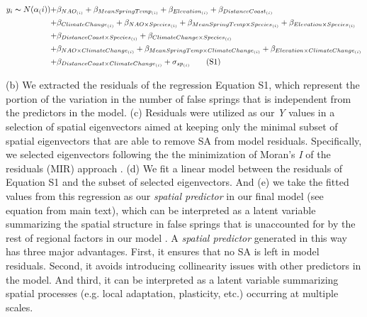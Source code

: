 \documentclass{article}\usepackage[]{graphicx}\usepackage[]{color}
\begin{document}
\begin{align*}
y_i \thicksim N(\alpha_(i)) +&  \beta_{NAO_{(i)}} + \beta_{MeanSpringTemp_{(i)}} + \beta_{Elevation_{(i)}} + \beta_{DistanceCoast_{(i)}} \\ +& \beta_{ClimateChange_{(i)}}
+ \beta_{NAO \times Species_{(i)}} + \beta_{MeanSpringTemp \times Species_{(i)}} + \beta_{Elevation \times Species_{(i)}} \\ +& \beta_{DistanceCoast \times Species_{(i)}} + \beta_{ClimateChange \times Species_{(i)}} \\
+& \beta_{NAO \times ClimateChange_{(i)}} + \beta_{MeanSpringTemp \times ClimateChange_{(i)}} 
+ \beta_{Elevation \times ClimateChange_{(i)}} \\ +& \beta_{DistanceCoast \times ClimateChange_{(i)}} + \sigma_{sp_{(i)}} \tag{S1}
\end{align*}

(b) We extracted the residuals of the regression Equation S1, which represent the portion of the variation in the number of false springs that is independent from the predictors in the model. (c) Residuals were utilized as our \emph{Y} values in a selection of spatial eigenvectors aimed at keeping only the minimal subset of spatial eigenvectors that are able to remove SA from model residuals. Specifically, we selected eigenvectors following the the minimization of Moran's \textit{I} of the residuals (MIR) approach \citep{griffith2006spatial,diniz2012selection,Baumen2017}. (d) We fit a linear model between the residuals of Equation S1 and the subset of selected eigenvectors. And (e) we take the fitted values from this regression as our \emph{spatial predictor} in our final model (see equation from main text), which can be interpreted as a latent variable summarizing the spatial structure in false springs that is unaccounted for by the rest of regional factors in our model \citep{morales2012imprint}. A \emph{spatial predictor} generated in this way has three major advantages. First, it ensures that no SA is left in model residuals. Second, it avoids introducing collinearity issues with other predictors in the model. And third, it can be interpreted as a latent variable summarizing spatial processes (e.g. local adaptation, plasticity, etc.) occurring at multiple scales.
\end{document}
